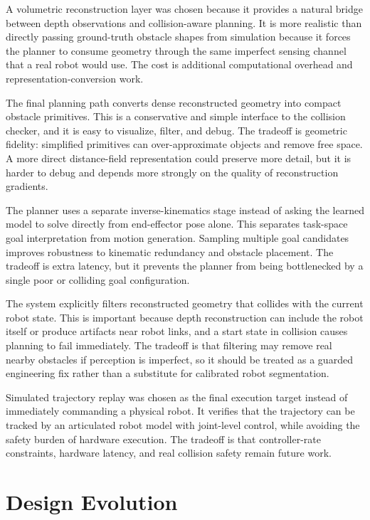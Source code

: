 \documentclass[11pt]{article}
\begin{document}
A volumetric reconstruction layer was chosen because it provides a natural bridge between depth observations and collision-aware planning. It is more realistic than directly passing ground-truth obstacle shapes from simulation because it forces the planner to consume geometry through the same imperfect sensing channel that a real robot would use. The cost is additional computational overhead and representation-conversion work.

The final planning path converts dense reconstructed geometry into compact obstacle primitives. This is a conservative and simple interface to the collision checker, and it is easy to visualize, filter, and debug. The tradeoff is geometric fidelity: simplified primitives can over-approximate objects and remove free space. A more direct distance-field representation could preserve more detail, but it is harder to debug and depends more strongly on the quality of reconstruction gradients.

The planner uses a separate inverse-kinematics stage instead of asking the learned model to solve directly from end-effector pose alone. This separates task-space goal interpretation from motion generation. Sampling multiple goal candidates improves robustness to kinematic redundancy and obstacle placement. The tradeoff is extra latency, but it prevents the planner from being bottlenecked by a single poor or colliding goal configuration.

The system explicitly filters reconstructed geometry that collides with the current robot state. This is important because depth reconstruction can include the robot itself or produce artifacts near robot links, and a start state in collision causes planning to fail immediately. The tradeoff is that filtering may remove real nearby obstacles if perception is imperfect, so it should be treated as a guarded engineering fix rather than a substitute for calibrated robot segmentation.

Simulated trajectory replay was chosen as the final execution target instead of immediately commanding a physical robot. It verifies that the trajectory can be tracked by an articulated robot model with joint-level control, while avoiding the safety burden of hardware execution. The tradeoff is that controller-rate constraints, hardware latency, and real collision safety remain future work.

\section{Design Evolution}
\end{document}
